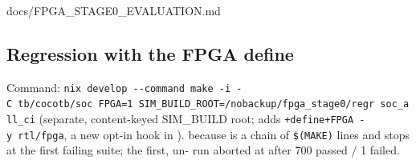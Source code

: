 \begin{relocated}{docs/FPGA_STAGE0_EVALUATION.md}
\subsection{Regression with the FPGA define}\label{tm:dec:fpga-stage0-evaluation:5-regression-with-the-fpga-define}

Command:
\texttt{nix\ develop\ -\allowbreak{}-\allowbreak{}command\ make\ -\allowbreak{}i\ -\allowbreak{}C\ tb/\allowbreak{}cocotb/\allowbreak{}soc\ FPGA=\allowbreak{}1\ SIM\_\allowbreak{}BUILD\_\allowbreak{}ROOT=\allowbreak{}/\allowbreak{}nobackup/\allowbreak{}fpga\_\allowbreak{}stage0/\allowbreak{}regr\ soc\_\allowbreak{}all\_\allowbreak{}ci}
(separate, content-keyed SIM\_BUILD root;  adds
\texttt{+\allowbreak{}define+\allowbreak{}FPGA\ -\allowbreak{}y\ rtl/\allowbreak{}fpga},
a new opt-in hook in ).  because
 is a chain of \texttt{\$(MAKE)} lines and stops at the
first failing suite; the first, un- run aborted at
 after 700 passed / 1 failed.

{\footnotesize\setlength{\tabcolsep}{3pt}

}
\end{relocated}

